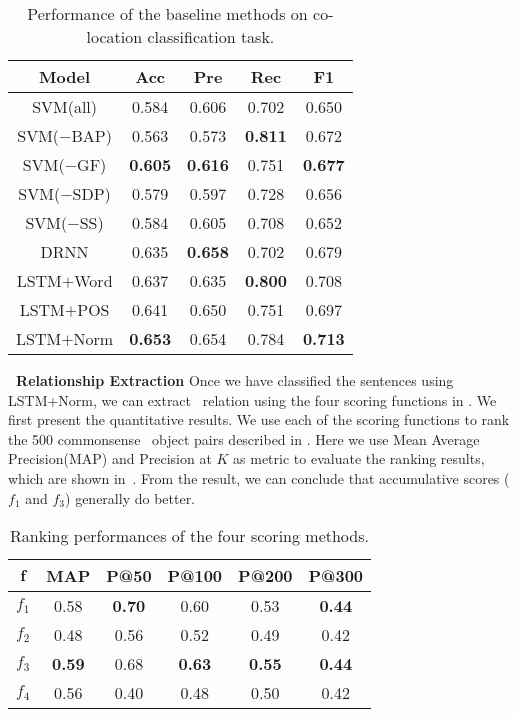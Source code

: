 \begin{table}[th!]
\small
	\centering
	
	\begin{tabular}{|c|c|c|c|c|}
		\hline
	\textbf{Model}	& \textbf{Acc} & \textbf{Pre} & \textbf{Rec} & \textbf{F1} \\		\hline \hline
	SVM(all) &	0.584 & 0.606 & 0.702  & 0.650  \\		\hline
	SVM($-$BAP)	& 0.563 &  0.573& \textbf{0.811}  & 0.672 \\		\hline
	SVM($-$GF)	&  \textbf{0.605} & \textbf{0.616} &0.751  & \textbf{0.677} \\		\hline
	SVM($-$SDP)	& 0.579 & 0.597 & 0.728  & 0.656\\		\hline
	SVM($-$SS)	&  0.584 &  0.605 &  0.708 & 	0.652	\\ \hline
	\hline
	DRNN	&  0.635 &  \textbf{0.658} &  0.702 & 	0.679	\\ \hline
	LSTM$+$Word 	&   0.637 & 0.635 & \textbf{0.800}   & 	 0.708	\\ \hline
	LSTM$+$POS	& 0.641 & 0.650  &  0.751 & 0.697	\\ \hline
	LSTM$+$Norm	&  \textbf{0.653 }&  0.654 & { 0.784} & 	\textbf{0.713}	\\ \hline
	\end{tabular}
	\caption{Performance of the baseline methods 
	on co-location classification task.}
	\label{tab:aprf}
\end{table}

\noindent
\textbf{\lnear\ Relationship Extraction}
Once we have classified the sentences using LSTM+Norm, we can extract \lnear\
relation using the four scoring functions in .
We first present the quantitative results. 
We use each of the scoring functions to 
rank the 500 commonsense \lnear\ object pairs described in . 
Here we use Mean Average Precision(MAP) and Precision at $K$ as metric 
to evaluate the ranking results, which are shown in~\tabref{tab:3m}.
From the result, we can conclude that accumulative scores ($f_1$ and $f_3$)
generally do better.
\begin{table}[th!]
\small
\centering
\begin{tabular}{|c|c|c|c|c|c|}
\hline
$\mathbf{f}$	& \textbf{MAP} & \textbf{P@50} & \textbf{P@100}  &  \textbf{P@200}& \textbf{P@300}\\ \hline \hline
	$f_1$	& 0.58  & {\bf 0.70} & 0.60& 0.53 & {\bf 0.44}\\\hline
	$f_2$	& 0.48 & 0.56 & 0.52  & 0.49 & 0.42\\\hline
	$f_3$	& {\bf 0.59} & 0.68& {\bf 0.63} & {\bf 0.55} & {\bf 0.44}\\\hline
	$f_4$	& 0.56 & 0.40 & 0.48 & 0.50 & 0.42\\\hline
	\end{tabular}
\caption{Ranking performances of the four scoring methods.}
\label{tab:3m}
\end{table}


